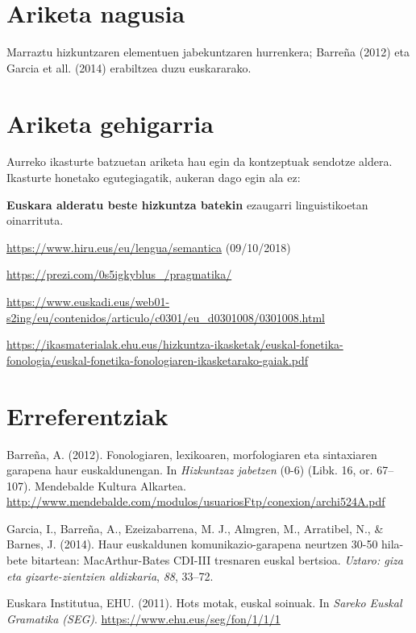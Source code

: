 \documentclass[
]{book}
\begin{document}
\hypertarget{T2A4}{%
\section*{Ariketa nagusia}\label{T2A4}}

Marraztu hizkuntzaren elementuen jabekuntzaren hurrenkera; Barreña (2012) eta Garcia et all. (2014) erabiltzea duzu euskararako.

\hypertarget{T2A5}{%
\section*{Ariketa gehigarria}\label{T2A5}}

Aurreko ikasturte batzuetan ariketa hau egin da kontzeptuak sendotze aldera. Ikasturte honetako egutegiagatik, aukeran dago egin ala ez:

\textbf{Euskara alderatu beste hizkuntza batekin} ezaugarri linguistikoetan oinarrituta.

\url{https://www.hiru.eus/eu/lengua/semantica} (09/10/2018)

\url{https://prezi.com/0s5igkyblus_/pragmatika/}

\url{https://www.euskadi.eus/web01-s2ing/eu/contenidos/articulo/c0301/eu_d0301008/0301008.html}

\url{https://ikasmaterialak.ehu.eus/hizkuntza-ikasketak/euskal-fonetika-fonologia/euskal-fonetika-fonologiaren-ikasketarako-gaiak.pdf}

\hypertarget{T2E}{%
\section*{Erreferentziak}\label{T2E}}

Barreña, A. (2012). Fonologiaren, lexikoaren, morfologiaren eta sintaxiaren garapena haur euskaldunengan. In \emph{Hizkuntzaz jabetzen} (0-6) (Libk. 16, or. 67--107). Mendebalde Kultura Alkartea. \url{http://www.mendebalde.com/modulos/usuariosFtp/conexion/archi524A.pdf}

Garcia, I., Barreña, A., Ezeizabarrena, M. J., Almgren, M., Arratibel, N., \& Barnes, J. (2014). Haur euskaldunen komunikazio-garapena neurtzen 30-50 hila-bete bitartean: MacArthur-Bates CDI-III tresnaren euskal bertsioa. \emph{Uztaro: giza eta gizarte-zientzien aldizkaria}, \emph{88}, 33--72.

Euskara Institutua, EHU. (2011). Hots motak, euskal soinuak. In \emph{Sareko Euskal Gramatika (SEG)}. \url{https://www.ehu.eus/seg/fon/1/1/1}
\end{document}
